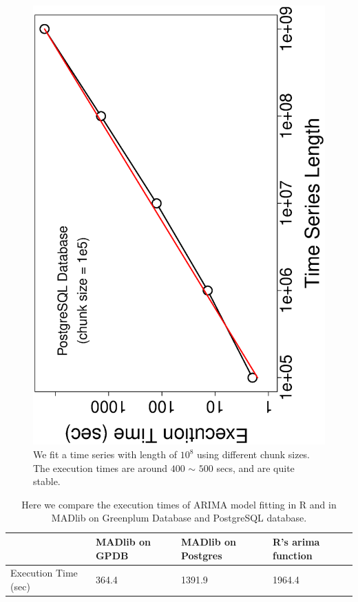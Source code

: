 \documentclass[english,10pt]{llncs}
\begin{document}
\begin{figure}[ht]
  \begin{centering}
    \includegraphics[angle=-90,scale=0.4]{pg_time_vs_size}
  \end{centering}
  \caption{\label{fig:pg_time_size} We fit a time series with length of
    $10^8$ using different chunk sizes. The execution times are around
    $400$ $\sim$ $500$ secs, and are quite stable. }
\end{figure}

\begin{table}[ht]
  \begin{tabular}{|l|l|l|l|}
    \hline
    ~ & MADlib on GPDB & MADlib on Postgres & R's arima function \\ \hline
    Execution Time (sec) & 364.4 & 1391.9 & 1964.4 \\ \hline
  \end{tabular}
  \caption{\label{tbl:compare_R} Here we compare the execution times of ARIMA model fitting in R and in MADlib on Greenplum Database and PostgreSQL database. }
\end{table}
\end{document}
